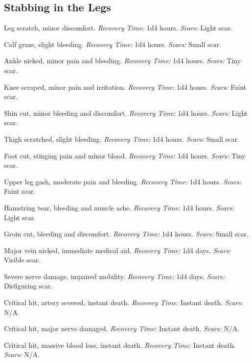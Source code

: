 \documentclass[12pt]{book}
\begin{document}
\subsection{Stabbing in the Legs}

\begin{description}[labelwidth=1.5em, leftmargin=*, itemsep=0.4em]
    \item[1 -] Leg scratch, minor discomfort. \textit{Recovery Time:} 1d4 hours. \textit{Scars:} Light scar.
    \item[2 -] Calf graze, slight bleeding. \textit{Recovery Time:} 1d4 hours. \textit{Scars:} Small scar.
    \item[3 -] Ankle nicked, minor pain and bleeding. \textit{Recovery Time:} 1d4 hours. \textit{Scars:} Tiny scar.
    \item[4 -] Knee scraped, minor pain and irritation. \textit{Recovery Time:} 1d4 hours. \textit{Scars:} Faint scar.
    \item[5 -] Shin cut, minor bleeding and discomfort. \textit{Recovery Time:} 1d4 hours. \textit{Scars:} Light scar.
    \item[6 -] Thigh scratched, slight bleeding. \textit{Recovery Time:} 1d4 hours. \textit{Scars:} Small scar.
    \item[7 -] Foot cut, stinging pain and minor blood. \textit{Recovery Time:} 1d4 hours. \textit{Scars:} Tiny scar.
    \item[8 -] Upper leg gash, moderate pain and bleeding. \textit{Recovery Time:} 1d4 hours. \textit{Scars:} Faint scar.
    \item[9 -] Hamstring tear, bleeding and muscle ache. \textit{Recovery Time:} 1d4 hours. \textit{Scars:} Light scar.
    \item[10 -] Groin cut, bleeding and discomfort. \textit{Recovery Time:} 1d4 hours. \textit{Scars:} Small scar.
    \item[11 -] Major vein nicked, immediate medical aid. \textit{Recovery Time:} 1d4 days. \textit{Scars:} Visible scar.
    \item[12 -] Severe nerve damage, impaired mobility. \textit{Recovery Time:} 1d4 days. \textit{Scars:} Disfiguring scar.
    \item[13 -] Critical hit, artery severed, instant death. \textit{Recovery Time:} Instant death. \textit{Scars:} N/A.
    \item[14 -] Critical hit, major nerve damaged. \textit{Recovery Time:} Instant death. \textit{Scars:} N/A.
    \item[15 -] Critical hit, massive blood loss, instant death. \textit{Recovery Time:} Instant death. \textit{Scars:} N/A.

\end{description}
\end{document}
